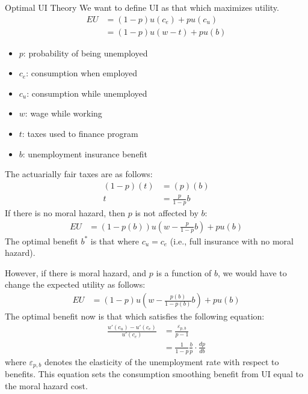 \documentclass[8pt]{extarticle}
\begin{document}
  \begin{problem}{Optimal UI Theory}
    We want to define UI as that which maximizes utility.
    \begin{align*}
      EU &= (1-p)u(c_e) + pu(c_u)\\
         &= (1-p)u(w-t) + pu(b)
    \end{align*}
    \begin{itemize}
      \item $p$: probability of being unemployed
      \item $c_e$: consumption when employed
      \item $c_u$: consumption while unemployed
      \item $w$: wage while working
      \item $t$: taxes used to finance program
      \item $b$: unemployment insurance benefit
    \end{itemize}
    The actuarially fair taxes are as follows:
    \begin{align*}
      (1-p)(t) &= (p)(b)\\
      t &= \frac{p}{1-p}b
    \end{align*}
    If there is no moral hazard, then $p$ is not affected by $b$:
    \begin{align*}
      EU &= (1-p(b))u\left(w-\frac{p}{1-p}b\right) + pu(b)
    \end{align*}
    The optimal benefit $b^*$ is that where $c_u = c_e$ (i.e., full insurance with no moral hazard).\newline

    However, if there is moral hazard, and $p$ is a function of $b$, we would have to change the expected utility as follows:
    \begin{align*}
      EU &= (1-p)u\left(w - \frac{p(b)}{1-p(b)}b\right) + pu(b)
    \end{align*}
    The optimal benefit now is that which satisfies the following equation:
    \begin{align*}
      \frac{u'(c_u) - u'(c_e)}{u'(c_e)} &= \frac{\varepsilon_{p,b}}{p-1}\\
       &= \frac{1}{1-p}\frac{b}{p}\cdot\frac{dp}{db}
    \end{align*}
    where $\varepsilon_{p,b}$ denotes the elasticity of the unemployment rate with respect to benefits. This equation sets the consumption smoothing benefit from UI equal to the moral hazard cost.\newline


\end{problem}
\end{document}
